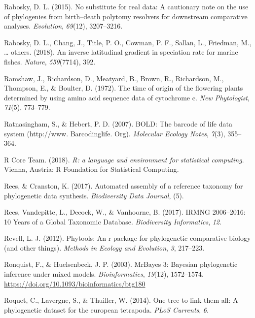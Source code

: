 \documentclass[english,man]{apa6}
\begin{document}
\leavevmode\hypertarget{ref-rabosky2015no}{}%
Rabosky, D. L. (2015). No substitute for real data: A cautionary note on the use of phylogenies from birth--death polytomy resolvers for downstream comparative analyses. \emph{Evolution}, \emph{69}(12), 3207--3216.

\leavevmode\hypertarget{ref-rabosky2018inverse}{}%
Rabosky, D. L., Chang, J., Title, P. O., Cowman, P. F., Sallan, L., Friedman, M., \ldots{} others. (2018). An inverse latitudinal gradient in speciation rate for marine fishes. \emph{Nature}, \emph{559}(7714), 392.

\leavevmode\hypertarget{ref-ramshaw1972time}{}%
Ramshaw, J., Richardson, D., Meatyard, B., Brown, R., Richardson, M., Thompson, E., \& Boulter, D. (1972). The time of origin of the flowering plants determined by using amino acid sequence data of cytochrome c. \emph{New Phytologist}, \emph{71}(5), 773--779.

\leavevmode\hypertarget{ref-ratnasingham2007bold}{}%
Ratnasingham, S., \& Hebert, P. D. (2007). BOLD: The barcode of life data system (http://www. Barcodinglife. Org). \emph{Molecular Ecology Notes}, \emph{7}(3), 355--364.

\leavevmode\hypertarget{ref-RCoreTeam2018}{}%
R Core Team. (2018). \emph{R: a language and environment for statistical computing}. Vienna, Austria: R Foundation for Statistical Computing.

\leavevmode\hypertarget{ref-rees2017automated}{}%
Rees, \& Cranston, K. (2017). Automated assembly of a reference taxonomy for phylogenetic data synthesis. \emph{Biodiversity Data Journal}, (5).

\leavevmode\hypertarget{ref-rees2017irmng}{}%
Rees, Vandepitte, L., Decock, W., \& Vanhoorne, B. (2017). IRMNG 2006--2016: 10 Years of a Global Taxonomic Database. \emph{Biodiversity Informatics}, \emph{12}.

\leavevmode\hypertarget{ref-Revell2012}{}%
Revell, L. J. (2012). Phytools: An r package for phylogenetic comparative biology (and other things). \emph{Methods in Ecology and Evolution}, \emph{3}, 217--223.

\leavevmode\hypertarget{ref-Ronquist2003}{}%
Ronquist, F., \& Huelsenbeck, J. P. (2003). MrBayes 3: Bayesian phylogenetic inference under mixed models. \emph{Bioinformatics}, \emph{19}(12), 1572--1574. \url{https://doi.org/10.1093/bioinformatics/btg180}

\leavevmode\hypertarget{ref-roquet2014one}{}%
Roquet, C., Lavergne, S., \& Thuiller, W. (2014). One tree to link them all: A phylogenetic dataset for the european tetrapoda. \emph{PLoS Currents}, \emph{6}.
\end{document}
